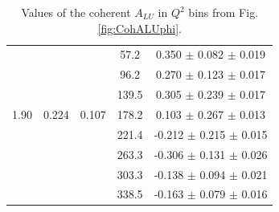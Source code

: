\documentclass[aps,prc,preprint,superscriptaddress]{revtex4}
\begin{document}
\begin{table}[!h]
\begin{center}
\begin{tabular}{|c|c|c|c|c|}
        &       &       &  57.2 &  0.350  $\pm$ 0.082  $\pm$ 0.019  \\ 
        &       &       &  96.2 &  0.270  $\pm$ 0.123  $\pm$ 0.017  \\ 
        &       &       & 139.5 &  0.305  $\pm$ 0.239  $\pm$ 0.017  \\ 
  1.90  & 0.224 & 0.107 & 178.2 &  0.103  $\pm$ 0.267  $\pm$ 0.013  \\ 
        &       &       & 221.4 & -0.212  $\pm$ 0.215  $\pm$ 0.015  \\ 
        &       &       & 263.3 & -0.306  $\pm$ 0.131  $\pm$ 0.026  \\ 
        &       &       & 303.3 & -0.138  $\pm$ 0.094  $\pm$ 0.021  \\ 
        &       &       & 338.5 & -0.163  $\pm$ 0.079  $\pm$ 0.016  \\ 
         \hline 
      \end{tabular}
      \caption{Values of the coherent $A_{LU}$ in $Q^2$ bins from Fig. \ref{fig:CohALUphi}.}
      \label{table:Coh_Q2_BSA}
   \end{center}
\end{table}                    
\end{document}
